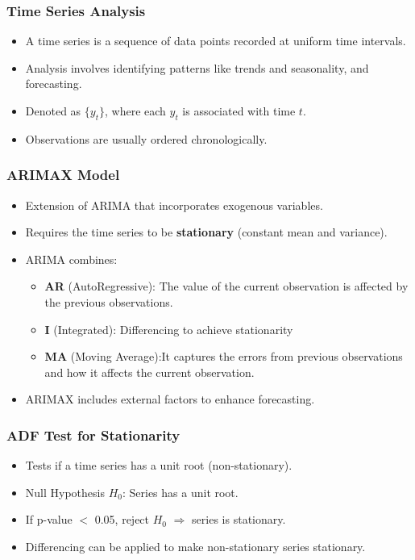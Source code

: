 \documentclass[12pt, aspectratio=169]{beamer}
\begin{document}
\begin{frame}
\frametitle{Time Series Analysis}
\begin{itemize}
    \item A time series is a sequence of data points recorded at uniform time intervals.
    \item Analysis involves identifying patterns like trends and seasonality, and forecasting.
    \item Denoted as $\{y_t\}$, where each $y_t$ is associated with time $t$.
    \item Observations are usually ordered chronologically.
\end{itemize}
\end{frame}

\begin{frame}
\frametitle{ARIMAX Model}
\begin{itemize}
    \item Extension of ARIMA that incorporates exogenous variables.
    \item Requires the time series to be \textbf{stationary} (constant mean and variance).
    \item ARIMA combines:
    \begin{itemize}
        \item \textbf{AR} (AutoRegressive): The value of the current observation is affected by the previous observations.
        \item \textbf{I} (Integrated): Differencing to achieve stationarity
        \item \textbf{MA} (Moving Average):It captures the errors from previous observations and how it affects the current observation.
    \end{itemize}
    \item ARIMAX includes external factors to enhance forecasting.
\end{itemize}
\end{frame}

\begin{frame}
\frametitle{ADF Test for Stationarity}
\begin{itemize}
    \item Tests if a time series has a unit root (non-stationary).
    \item Null Hypothesis $H_0$: Series has a unit root.
    \item If p-value $<$ 0.05, reject $H_0$ $\Rightarrow$ series is stationary.
    \item Differencing can be applied to make non-stationary series stationary.
\end{itemize}

\end{frame}
\end{document}

